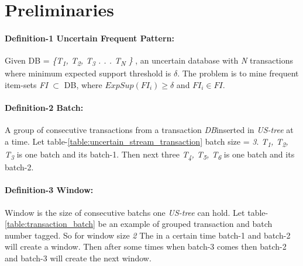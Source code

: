     
\section{Preliminaries}
    \paragraph{Definition-1 Uncertain Frequent Pattern: }
    Given DB = \emph{\{T\textsubscript{1}, T\textsubscript{2}, T\textsubscript{3} . . . T\textsubscript{N} \}} , an uncertain database with \emph{N} transactions where minimum expected support threshold is $\delta$. The problem is to mine frequent item-sets \emph{FI} $\subset$ DB, where $ExpSup(FI_i) \geq \delta $ and $FI_i \in FI$.
    
    \paragraph{Definition-2 Batch: }
    A group of consecutive transactions from a transaction \emph{DB}inserted in \emph{US-tree} at a time. Let table-\ref{table:uncertain_stream_transaction} batch size = \emph{3}. \emph{T\textsubscript{1}, T\textsubscript{2}, T\textsubscript{3}} is one batch and its batch-1. Then next three \emph{T\textsubscript{4}, T\textsubscript{5}, T\textsubscript{6}} is one batch and its batch-2.
    
    \paragraph{Definition-3 Window: } Window is the size of consecutive batchs one \emph{US-tree} can hold. Let table-\ref{table:transaction_batch} be an example of grouped transaction and batch number tagged. So for window size \emph{2} The in a certain time batch-1 and batch-2 will create a window. Then after some times when batch-3 comes then batch-2 and batch-3 will create the next window.
    
